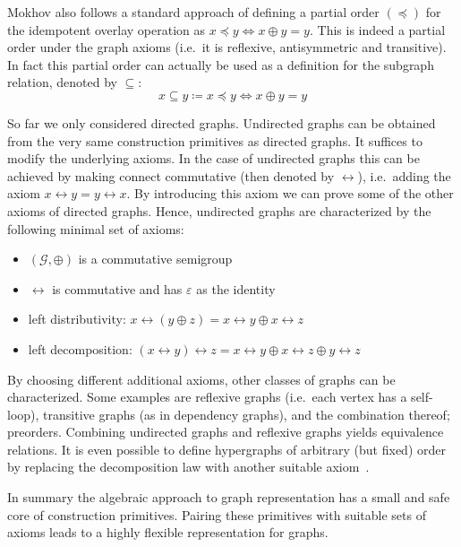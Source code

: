 \documentclass{article}
\renewcommand{\epsilon}{\varepsilon}
\newcommand{\eps}{\epsilon}
\newcommand{\overlay}{\oplus}
\begin{document}
Mokhov also follows a standard approach of defining a partial order $(\preceq)$ for the
idempotent overlay operation as $x \preceq y \iff x \overlay y = y$. This is indeed
a partial order under the graph axioms (i.e.\ it is reflexive, antisymmetric and
transitive). In fact this partial order can actually be used as a definition for
the subgraph relation, denoted by $\subseteq$:
\[
  x \subseteq y \coloneqq x \preceq y \iff x \overlay y = y
\]

So far we only considered directed graphs. Undirected graphs can be
obtained from the very same construction primitives as directed graphs. It suffices
to modify the underlying axioms. In the case of undirected graphs this can be
achieved by making connect commutative (then denoted by $\leftrightarrow$),
i.e.\ adding the axiom $x \leftrightarrow y = y \leftrightarrow x$. By
introducing this axiom we can prove some of the other axioms of directed graphs.
Hence, undirected graphs are characterized by the following minimal set of
axioms:
\begin{itemize}
\item $(\mathcal{G}, \oplus)$ is a commutative semigroup
\item $\leftrightarrow$ is commutative and has $\eps$ as the identity
\item left distributivity: $x \leftrightarrow (y \oplus z) = x \leftrightarrow
  y \oplus x \leftrightarrow z$
\item left decomposition: $(x \leftrightarrow y) \leftrightarrow z = x
  \leftrightarrow y \oplus x \leftrightarrow z \oplus y \leftrightarrow z$
\end{itemize}
By choosing different additional axioms, other classes of graphs can be
characterized. Some examples are reflexive graphs (i.e.\ each vertex has a
self-loop), transitive graphs (as in dependency graphs), and the combination
thereof; preorders. Combining undirected graphs and reflexive graphs yields
equivalence relations. It is even possible to define hypergraphs of arbitrary
(but fixed) order by replacing the decomposition law with another suitable
axiom~\cite{mokhov2017algebraic}.

In summary the algebraic approach to graph representation has a small and safe
core of construction primitives. Pairing these primitives with suitable sets of
axioms leads to a highly flexible representation for graphs.
\end{document}
